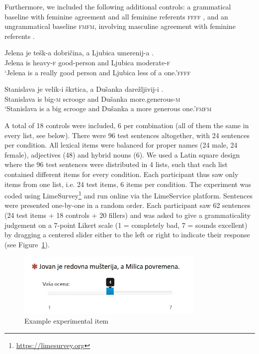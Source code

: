 \documentclass[output=paper,
modfonts,
newtxmath,
hidelinks
]{langscibook}
\begin{document}
\noindent Furthermore, we included the following additional controls: a grammatical baseline with feminine agreement and all feminine referents \textsc{ffff} , and an ungrammatical baseline \textsc{fmfm}, involving masculine agreement with feminine referents . 

  			\ea \gll Jelena je tešk{-a} dobričina, a Ljubica umerenij{-a} \underline{\hspace{1.5cm}}.\\
  			Jelena is heavy{-\textsc{f}} good-person and Ljubica moderate{-\textsc{f}}\\
  			\glt `Jelena is a really good person and Ljubica less of a one.'\hfill  \textsc{ffff}\label{14:ex15}
            \z
			
  			\ea \gll Stanislava je velik{-i} škrtica, a Dušanka darežljivij{-i} \underline{\hspace{1.5cm}}.\\
  			Stanislava is big{-\textsc{m}} scrooge and Dušanka more.generous{-\textsc{m}}\\
  			\glt `Stanislava is a big scrooge and Dušanka a more generous one.'\hfill  \textsc{fmfm}\label{14:ex16}
            \z

\noindent A total of 18 controls were included, 6 per combination (all of them the same in every list, see below).			
There were 96 test sentences altogether, with 24 sentences per condition. All lexical items were balanced for proper names (24 male, 24 female), adjectives (48) and hybrid nouns (6).
 We used a Latin square design where the 96 test sentences were distributed in 4 lists, such that each list contained different items for every condition. 
 Each participant thus saw only items from one list, i.e. 24 test items, 6 items per condition. 
 The experiment was coded using LimeSurvey\footnote{\url{https://limesurvey.org}} and run online via the LimeService platform.
  	 Sentences were presented one-by-one in a random order. 
Each participant saw 62 sentences (24 test items + 18 controls + 20 fillers)  
 and was asked to give a grammaticality judgement on a 7-point Likert scale (1 = completely bad, 7 = sounds excellent) by dragging a centered slider either to the left or right to indicate their response (see Figure~\ref{14:slider}). 
  		
  		\begin{figure}[t]
  			\centering
  			\includegraphics[width=9cm]{figures/14example.jpg}
  			\caption{Example experimental item }
			\label{14:slider}
  		\end{figure}
 		
\end{document}
